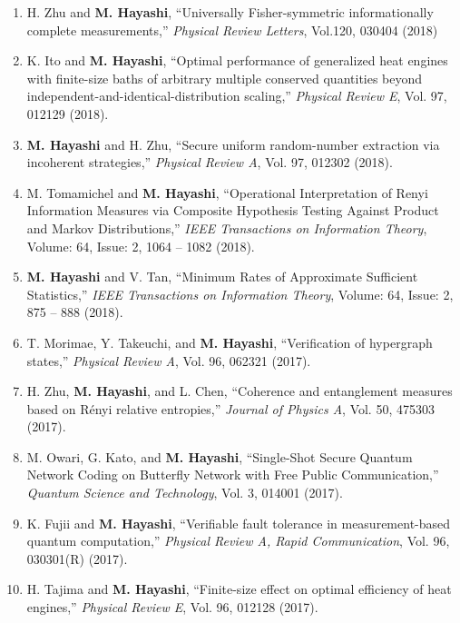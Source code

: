 \documentclass[a4paper,12pt,oneside]{article}
\begin{document}
\begin{enumerate}
\item 
H. Zhu and \textbf{M. Hayashi},
``Universally Fisher-symmetric informationally complete measurements,''
{\em Physical Review Letters}, Vol.120, 030404 (2018)

\item 
K. Ito and \textbf{M. Hayashi},
``Optimal performance of generalized heat engines with finite-size baths
of arbitrary multiple conserved quantities beyond independent-and-identical-distribution scaling,''
{\em Physical Review E}, Vol. 97, 012129 (2018).

\item 
\textbf{M. Hayashi} and H. Zhu,
``Secure uniform random-number extraction via incoherent strategies,''
{\em Physical Review A}, Vol. 97, 012302 (2018).

\item 
M. Tomamichel and \textbf{M. Hayashi}, 
``Operational Interpretation of Renyi Information Measures via Composite Hypothesis Testing Against Product and Markov Distributions,''
{\em IEEE Transactions on Information Theory},
Volume: 64, Issue: 2, 1064 -- 1082 (2018). 

\item 
\textbf{M. Hayashi} and V. Tan, 
``Minimum Rates of Approximate Sufficient Statistics,''
{\em IEEE Transactions on Information Theory},
Volume: 64, Issue: 2, 875 -- 888 (2018). 

\item 
T. Morimae, Y. Takeuchi, and \textbf{M. Hayashi},
``Verification of hypergraph states,''
{\em Physical Review A}, Vol. 96, 062321 (2017).

\item 
H. Zhu, \textbf{M. Hayashi}, and L. Chen, 
``Coherence and entanglement measures based on R\'{e}nyi relative entropies,''
{\em Journal of Physics A},
Vol. 50, 475303 (2017).

\item
M. Owari, G. Kato, and \textbf{M. Hayashi},
``Single-Shot Secure Quantum Network Coding on Butterfly Network with Free Public Communication,''
{\em Quantum Science and Technology},
Vol. 3, 014001 (2017). 

\item
K. Fujii and \textbf{M. Hayashi},
``Verifiable fault tolerance in measurement-based quantum computation,''
{\em Physical Review A, Rapid Communication},
Vol. 96, 030301(R) (2017).

\item
H. Tajima and \textbf{M. Hayashi},
``Finite-size effect on optimal efficiency of heat engines,''
{\em Physical Review E}, Vol. 96, 012128 (2017).


\end{enumerate}
\end{document}
